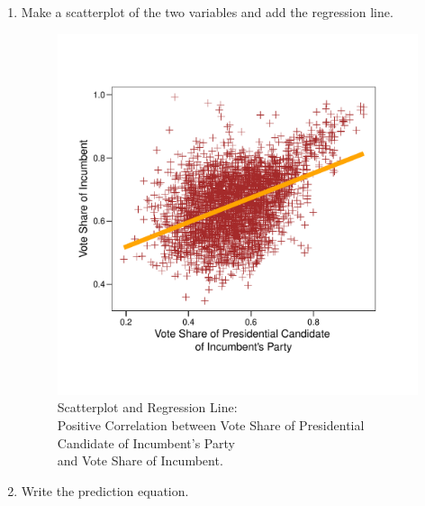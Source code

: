 \documentclass[12pt,letterpaper]{article}
\begin{document}
\begin{enumerate}
			\texttt This bi-variate linear regression model indicates that for \textbf{every 1-unit increase} in the Vote Share of the Presidential Candidate of the Incumbent's Party, on average, the Vote Share for the Incumbent increases by \textbf{approx. 0.39 unit points}.
			
			The coefficient has a p-value less than 0.001, which is less than a critical value of 0.05, giving evidence to reject the null hypothesis that the relationship between the vote share of the Incumbent Party's Presidential Candidate and the vote share of the Incumbent is zero - and giving evidence for the alternative hypothesis that the relationship is non-zero. It is not possible to indicate a causal relationship with this method.

		\item Make a scatterplot of the two variables and add the regression line. 
		
			
		
			\begin{figure}[H]
				\centering
				\captionsetup{justification=centering, font = footnotesize}
				\caption{Scatterplot and Regression Line: \\
					Positive Correlation between Vote Share of Presidential Candidate of Incumbent's Party \\
					and Vote Share of Incumbent.}
				\label{fig:plot_Q3}
				\includegraphics[width=.75\textwidth, trim = 0 2cm 0 2cm, clip]{plot_Q3.pdf}
			\end{figure}
		
		\item Write the prediction equation.
		

\end{enumerate}
\end{document}
